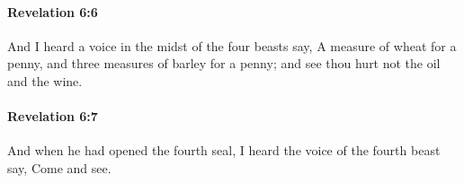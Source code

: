 		\paragraph{Revelation 6:6} %
			\label{REVELATIONNT-6-6}

			And I heard a voice in the midst of the four beasts say, A measure of wheat for a penny, and three measures of barley for a penny; and see thou hurt not the oil and the wine.

			\begin{framed}
			\scriptsize
				\begin{compactdesc}
					\item[SBLG] 
				\end{compactdesc}
			\end{framed}

		\paragraph{Revelation 6:7} %
			\label{REVELATIONNT-6-7}

			And when he had opened the fourth seal, I heard the voice of the fourth beast say, Come and see.


